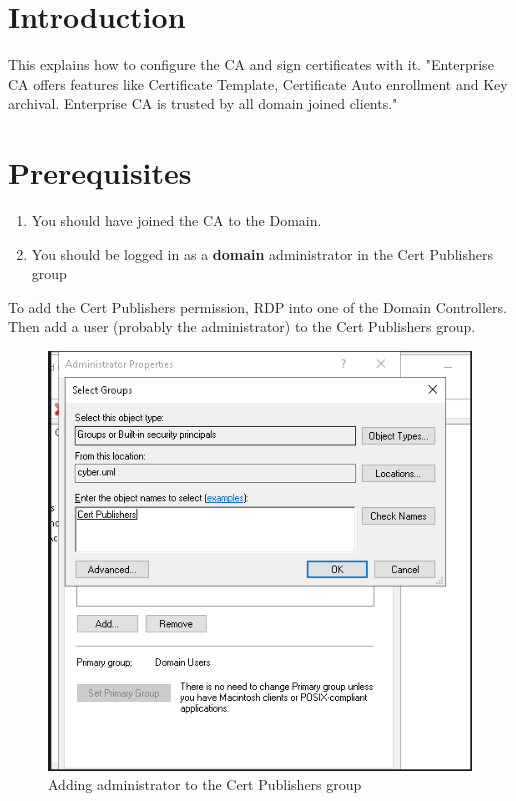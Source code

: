 \documentclass{article}
\begin{document}
\graphicspath{ {./Images/} }
\tableofcontents

\section{Introduction}
This explains how to configure the CA and sign certificates with it.
"Enterprise CA offers features like Certificate Template, Certificate Auto enrollment and Key archival. 
Enterprise CA is trusted by all domain joined clients."

\section{Prerequisites}
\begin {enumerate}
\item You should have joined the CA to the Domain.
\item You should be logged in as a \textbf{domain} administrator in the Cert Publishers group
\end {enumerate}

To add the Cert Publishers permission, RDP into one of the Domain Controllers.
Then add a user (probably the administrator) to the Cert Publishers group.

\begin{figure}[H]
        \centering
        \includegraphics[width=1\textwidth]{AddingCertPublisherPermission.png}
        \caption{Adding administrator to the Cert Publishers group}
        \label{fig:AddingCertPublisherPermission}
\end{figure}
\end{document}
